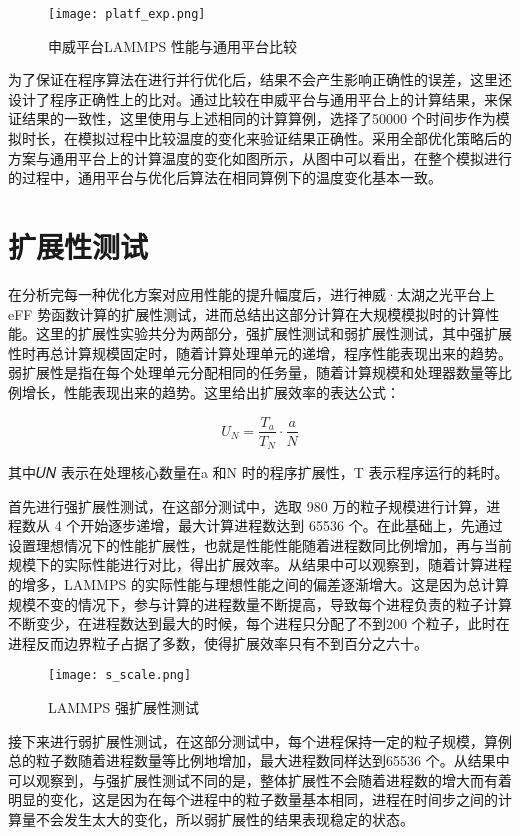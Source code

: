  \begin{figure}[h]
  \centering
  \texttt{[image: platf\_exp.png]}
  \caption{申威平台LAMMPS 性能与通用平台比较}
\end{figure}

为了保证在程序算法在进行并行优化后，结果不会产生影响正确性的误差，这里还设计了程序正确性上的比对。通过比较在申威平台与通用平台上的计算结果，来保证结果的一致性，这里使用与上述相同的计算算例，选择了50000 个时间步作为模拟时长，在模拟过程中比较温度的变化来验证结果正确性。采用全部优化策略后的方案与通用平台上的计算温度的变化如图所示，从图中可以看出，在整个模拟进行的过程中，通用平台与优化后算法在相同算例下的温度变化基本一致。

\section{扩展性测试}
在分析完每一种优化方案对应用性能的提升幅度后，进行神威·太湖之光平台上 eFF 势函数计算的扩展性测试，进而总结出这部分计算在大规模模拟时的计算性能。这里的扩展性实验共分为两部分，强扩展性测试和弱扩展性测试，其中强扩展性时再总计算规模固定时，随着计算处理单元的递增，程序性能表现出来的趋势。弱扩展性是指在每个处理单元分配相同的任务量，随着计算规模和处理器数量等比例增长，性能表现出来的趋势。这里给出扩展效率的表达公式：

\begin{equation}
  U_N=\frac{T_a}{T_N}\cdot \frac{a}{N}
\end{equation}

其中𝑈𝑁 表示在处理核心数量在a 和N 时的程序扩展性，T 表示程序运行的耗时。

首先进行强扩展性测试，在这部分测试中，选取 980 万的粒子规模进行计算，进程数从 4 个开始逐步递增，最大计算进程数达到 65536 个。在此基础上，先通过设置理想情况下的性能扩展性，也就是性能性能随着进程数同比例增加，再与当前规模下的实际性能进行对比，得出扩展效率。从结果中可以观察到，随着计算进程的增多，LAMMPS 的实际性能与理想性能之间的偏差逐渐增大。这是因为总计算规模不变的情况下，参与计算的进程数量不断提高，导致每个进程负责的粒子计算不断变少，在进程数达到最大的时候，每个进程只分配了不到200 个粒子，此时在进程反而边界粒子占据了多数，使得扩展效率只有不到百分之六十。

 \begin{figure}[h]
  \centering
  \texttt{[image: s\_scale.png]}
  \caption{LAMMPS 强扩展性测试}
\end{figure}

 接下来进行弱扩展性测试，在这部分测试中，每个进程保持一定的粒子规模，算例总的粒子数随着进程数量等比例地增加，最大进程数同样达到65536 个。从结果中可以观察到，与强扩展性测试不同的是，整体扩展性不会随着进程数的增大而有着明显的变化，这是因为在每个进程中的粒子数量基本相同，进程在时间步之间的计算量不会发生太大的变化，所以弱扩展性的结果表现稳定的状态。

